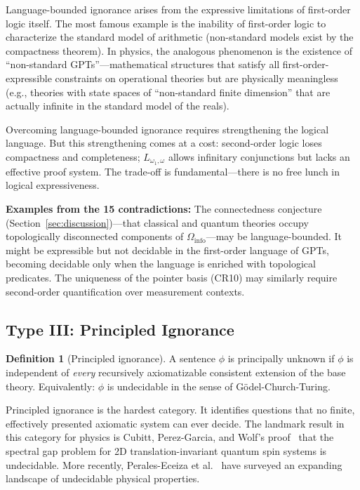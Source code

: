 \documentclass[12pt,a4paper]{article}
\theoremstyle{definition}
\newtheorem{definition}[theorem]{Definition}
\theoremstyle{remark}
\begin{document}
Language-bounded ignorance arises from the expressive limitations of first-order logic itself. The most famous example is the inability of first-order logic to characterize the standard model of arithmetic (non-standard models exist by the compactness theorem). In physics, the analogous phenomenon is the existence of ``non-standard GPTs''---mathematical structures that satisfy all first-order-expressible constraints on operational theories but are physically meaningless (e.g., theories with state spaces of ``non-standard finite dimension'' that are actually infinite in the standard model of the reals).

Overcoming language-bounded ignorance requires strengthening the logical language. But this strengthening comes at a cost: second-order logic loses compactness and completeness; $L_{\omega_1,\omega}$ allows infinitary conjunctions but lacks an effective proof system. The trade-off is fundamental---there is no free lunch in logical expressiveness.

\textbf{Examples from the 15 contradictions:} The connectedness conjecture (Section~\ref{sec:discussion})---that classical and quantum theories occupy topologically disconnected components of $\Omega_{\mathrm{info}}$---may be language-bounded. It might be expressible but not decidable in the first-order language of GPTs, becoming decidable only when the language is enriched with topological predicates. The uniqueness of the pointer basis (CR10) may similarly require second-order quantification over measurement contexts.

\subsection{Type III: Principled Ignorance}

\begin{definition}[Principled ignorance]
A sentence $\phi$ is principally unknown if $\phi$ is independent of \emph{every} recursively axiomatizable consistent extension of the base theory. Equivalently: $\phi$ is undecidable in the sense of G\"odel-Church-Turing.
\end{definition}

Principled ignorance is the hardest category. It identifies questions that no finite, effectively presented axiomatic system can ever decide. The landmark result in this category for physics is Cubitt, Perez-Garcia, and Wolf's proof~\cite{Cubitt2015} that the spectral gap problem for 2D translation-invariant quantum spin systems is undecidable. More recently, Perales-Eceiza et al.~\cite{Perales2025} have surveyed an expanding landscape of undecidable physical properties.
\end{document}
